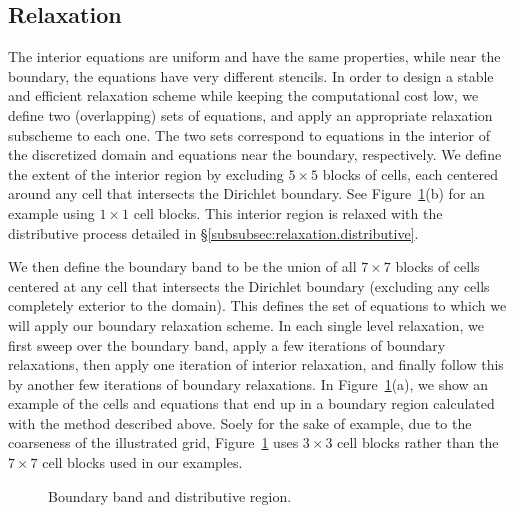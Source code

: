 \subsection{Relaxation}

The interior equations are uniform and have the same properties, while near the boundary, the equations have very different stencils. In order to design a stable and efficient relaxation scheme while keeping the computational cost low, we define two (overlapping) sets of equations, and apply an appropriate relaxation subscheme to each one. The two sets correspond to equations in the interior of the discretized domain and equations near the boundary, respectively. We define the extent of the interior region by excluding $5 \times 5$ blocks of cells, each centered around any cell that intersects the Dirichlet boundary. See Figure~\ref{fig:ch5.boundaryband}(b) for an example using $1 \times 1$ cell blocks. This interior region is relaxed with the distributive process detailed in \S\ref{subsubsec:relaxation.distributive}.

We then define the boundary band to be the union of all $7 \times 7$ blocks of cells centered at any cell that intersects the Dirichlet boundary (excluding any cells completely exterior to the domain). This defines the set of equations to which we will apply our boundary relaxation scheme. In each single level relaxation, we first sweep over the boundary band, apply a few iterations of boundary relaxations, then apply one iteration of interior relaxation, and finally follow this by another few iterations of boundary relaxations. In Figure~\ref{fig:ch5.boundaryband}(a), we show an example of the cells and equations that end up in a boundary region calculated with the method described above. Soely for the sake of example, due to the coarseness of the illustrated grid, Figure~\ref{fig:ch5.boundaryband} uses $3 \times 3$ cell blocks rather than the $7 \times 7$ cell blocks used in our examples.

\setlength{\figureheight}{0.40\columnwidth}
\begin{figure}[htbp]
\begin{center}
\caption{Boundary band and distributive region.}
\label{fig:ch5.boundaryband}
\end{center}
\end{figure}

